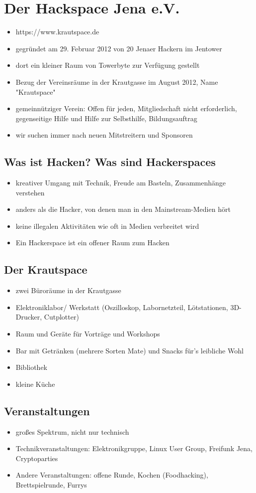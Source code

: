 \documentclass[a4paper,12pt,twoside]{scrartcl}
\newcommand{\itemlinespace}{\setlength{\itemsep}{1pt}}
\begin{document}
\thispagestyle{empty}
\section*{Der Hackspace Jena e.V.}
\begin{itemize}
\itemlinespace{}
\item https://www.krautspace.de
\item gegründet am 29. Februar 2012 von 20 Jenaer Hackern im Jentower
\item dort ein kleiner Raum von Towerbyte zur Verfügung gestellt
\item Bezug der Vereinsräume in der Krautgasse im August 2012, Name "Krautspace"
\item gemeinnütziger Verein: Offen für jeden, Mitgliedschaft nicht erforderlich, gegenseitige Hilfe und Hilfe zur Selbsthilfe, Bildungsauftrag
\item wir suchen immer nach neuen Mitstreitern und Sponsoren
\end{itemize}
\subsection*{Was ist Hacken? Was sind Hackerspaces}
\begin{itemize}
\itemlinespace{}
\item kreativer Umgang mit Technik, Freude am Basteln, Zusammenhänge verstehen
\item anders als die Hacker, von denen man in den Mainstream-Medien hört
\item keine illegalen Aktivitäten wie oft in Medien verbreitet wird
\item Ein Hackerspace ist ein offener Raum zum Hacken
\end{itemize}
\subsection*{Der Krautspace}
\begin{itemize}
\itemlinespace{}
\item zwei Büroräume in der Krautgasse
\item Elektroniklabor/ Werkstatt (Oszilloskop, Labornetzteil, Lötstationen, 3D-Drucker, Cutplotter)
\item Raum und Geräte für Vorträge und Workshops
\item Bar mit Getränken (mehrere Sorten Mate) und Snacks für's leibliche Wohl
\item Bibliothek
\item kleine Küche
\end{itemize}
\subsection*{Veranstaltungen}
\begin{itemize}
\itemlinespace{}
\item großes Spektrum, nicht nur technisch
\item Technikveranstaltungen: Elektronikgruppe, Linux User Group, Freifunk Jena, Cryptoparties
\item Andere Veranstaltungen: offene Runde, Kochen (Foodhacking), Brettspielrunde,  Furrys
\end{itemize}
\end{document}
